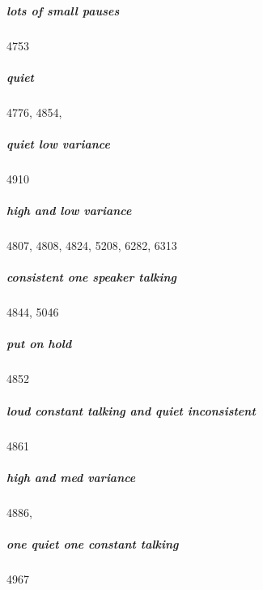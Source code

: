 	\subparagraph{lots of small pauses} 4753
	
	\subparagraph{quiet} 4776, 4854, 
	
	\subparagraph{quiet low variance} 4910
	
	\subparagraph{high and low variance} 4807, 4808, 4824, 5208, 6282, 6313
	
	\subparagraph{consistent one speaker talking} 4844, 5046
	
	\subparagraph{put on hold} 4852
	
	\subparagraph{loud constant talking and quiet inconsistent} 4861
	
	\subparagraph{high and med variance} 4886, 
	
	\subparagraph{one quiet one constant talking} 4967